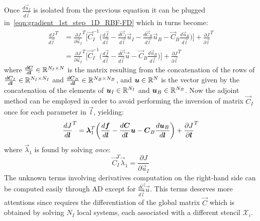 Once $\frac{d\vec{u}_I}{d\vec{l}}$ is isolated from the previous equation it can be plugged in~\eqref{eqn:gradient_1st_step_1D_RBF-FD} which in turns become:
\begin{equation}
\begin{aligned}
	\frac{dJ}{d\vec{l}}^T & = \frac{\partial J}{\partial \vec{u}_I}^T \biggl[ \vec{C}_I^{-1} \biggl( \frac{d\vec{f}}{d\vec{l}} - \frac{d\vec{C}_I}{d\vec{l}} \vec{u}_I - \frac{d\vec{C}_B}{d\vec{l}} \vec{u}_B - \vec{C}_B \frac{d\vec{u}_B}{d\vec{l}} \biggr) \biggr] + \frac{\partial J}{\partial \vec{l}}^T  \\[2ex]
						  & = \frac{\partial J}{\partial \vec{u}_I}^T \biggl[ \vec{C}_I^{-1} \biggl( \frac{d\vec{f}}{d\vec{l}} - \frac{d\vec{C}}{d\vec{l}} \vec{u} - \vec{C}_B \frac{d\vec{u}_B}{d\vec{l}} \biggr) \biggr] + \frac{\partial J}{\partial \vec{l}}^T
\end{aligned}
\end{equation}
where $\frac{d\vec{C}}{d\vec{l}} \in \R^{N_I \times N}$ is the matrix resulting from the concatenation of the rows of $\frac{d\vec{C}_I}{d\vec{l}} \in \R^{N_I \times N_I}$ and $\frac{d\vec{C}_B}{d\vec{l}} \in \R^{N_B \times N_B}$, and $\vec{u} \in \R^{N}$ is the vector given by the concatenation of the elements of $\vec{u}_I \in \R^{N_I}$ and $\vec{u}_B \in \R^{N_B}$.
Now the adjoint method can be employed in order to avoid performing the inversion of matrix $\vec{C}_I$ once for each parameter in $\vec{l}$, yielding:
\begin{equation}
	\frac{dJ}{d\vec{l}}^T =  \vec{\lambda}_1^T \biggl( \frac{d\vec{f}}{d\vec{l}} - \frac{d\vec{C}}{d\vec{l}} \vec{u} - \vec{C}_B \frac{d\vec{u}_B}{d\vec{l}} \biggr) + \frac{\partial J}{\partial \vec{l}}^T  \\
\end{equation}
where $\vec{\lambda}_1$ is found by solving \emph{once}:
\begin{equation}
	\vec{C}_I^T \vec{\lambda}_1 = \frac{\partial J}{\partial \vec{u}_I}
\end{equation}
The unknown terms involving derivatives computation on the right-hand side can be computed easily through AD except for $\frac{d\vec{C}}{d\vec{l}} \vec{u}$. This terms deserves more attentions since requires the differentiation of the global matrix $\vec{C}$ which is obtained by solving $N_I$ local systems, each associated with a different stencil $\mathcal{X}_i$.

